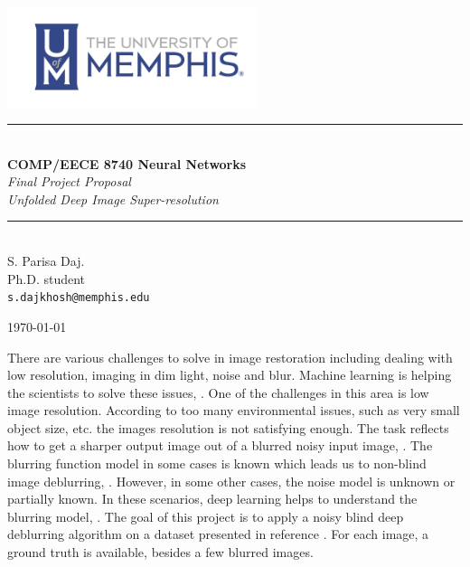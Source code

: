 \documentclass[12pt,a4paper]{article}
\newcommand{\HRule}{\rule{\linewidth}{0.5mm}}
\begin{document}
	
	\begin{titlepage}
		\begin{center}
			
			\includegraphics[width=0.55\textwidth]{figs/cslogo_horizontal.png}~\\[2cm]
			
			
			\HRule \\[0.4cm]
			{ \LARGE 
				\textbf{COMP/EECE 8740 Neural Networks}\\[0.4cm]
				\emph{Final Project Proposal}\\[0.4cm]
				\emph{Unfolded Deep Image Super-resolution}\\[0.4cm]
			}
			\HRule \\[1.5cm]
			
			
			
			{ \large
				S. Parisa Daj. \\[0.1cm]
				Ph.D. student\\[0.1cm]
				\texttt{s.dajkhosh@memphis.edu}
			}
			
			\vfill
			
			
			{\large \today}
			
		\end{center}
	\end{titlepage}

There are various challenges to solve in image restoration including dealing with low resolution, imaging in dim light, noise and blur. Machine learning is helping the scientists to solve these issues, \cite{Ozcan2019}. One of the challenges in this area is low image resolution.  According to too many environmental issues, such as very small object size, etc. the images resolution is not satisfying enough. The task reflects how to get a sharper output image out of a blurred noisy input image, \cite{Li2020}. The blurring function model in some cases is known which leads us to non-blind image deblurring, \cite{Nan2020}. However, in some other cases, the noise model is unknown or partially known. In these scenarios, deep learning helps to understand the blurring model, \cite{Li2020}. The goal of this project is to apply a noisy blind deep deblurring algorithm on a dataset presented in reference \cite{vem}. For each image, a ground truth is available, besides a few blurred images. 



\end{document}
